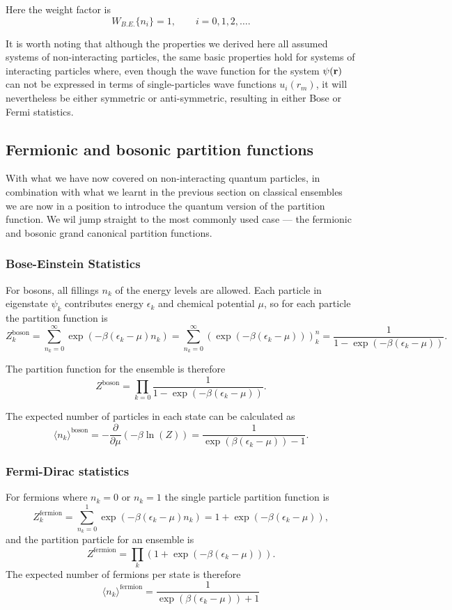 Here the weight factor is
$$
	W_{B.E.}\{n_i\} = 1,\qquad i=0,1,2,\ldots.
$$

It is worth noting that although the properties we derived here all assumed systems of non-interacting particles, the same basic properties hold for systems of interacting particles where, even though the wave function for the system $\psi({\bf r})$ can not be expressed in terms of single-particles wave functions $u_i(r_m)$, it will nevertheless be either symmetric or anti-symmetric, resulting in either Bose or Fermi statistics.



\subsection{Fermionic and bosonic partition functions}
With what we have now covered on non-interacting quantum particles, in combination with what we learnt in the previous section on classical ensembles we are now in a position to introduce the quantum version of the partition function. We wil jump straight to the most commonly used case --- the fermionic and bosonic grand canonical partition functions.

\subsubsection{Bose-Einstein Statistics}
For bosons, all fillings $n_k$ of the energy levels are allowed. Each particle in eigenstate $\psi_k$ contributes energy $\epsilon_k$ and chemical potential $\mu$, so for each particle the partition function is
$$
	Z_k^\text{boson} = \sum_{n_k=0}^\infty\exp(-\beta(\epsilon_k-\mu)n_k) = \sum_{n_k=0}^\infty\left(\exp(-\beta(\epsilon_k-\mu))\right)^n_k = \frac{1}{1-\exp(-\beta(\epsilon_k-\mu))}.
$$

The partition function for the ensemble is therefore
$$
	Z^\text{boson} = \prod_{k=0} \frac{1}{1-\exp(-\beta(\epsilon_k-\mu))}.
$$

The expected number of particles in each state can be calculated as
$$
	\langle n_k \rangle^\text{boson} = -\frac{\partial}{\partial \mu}(-\beta\ln(Z)) = \frac{1}{\exp(\beta(\epsilon_k-\mu))-1}.
$$

\subsubsection{Fermi-Dirac statistics}
For fermions where $n_k=0$ or $n_k=1$ the single particle partition function is
$$
	Z_k^\text{fermion} = \sum_{n_k=0}^1 \exp(-\beta(\epsilon_k-\mu)n_k) = 1 + \exp(-\beta(\epsilon_k-\mu)),
$$
and the partition particle for an ensemble is
$$
	Z^\text{fermion} = \prod_k(1+ \exp(-\beta(\epsilon_k-\mu))).
$$
The expected number of fermions per state is therefore
$$
		\langle n_k \rangle^\text{fermion} = \frac{1}{\exp(\beta(\epsilon_k-\mu))+1}
$$

